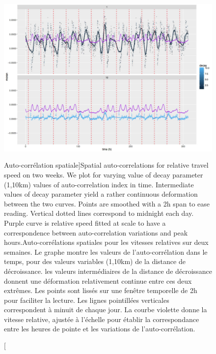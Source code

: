 \begin{figure}
\includegraphics[width=\linewidth]{Figures/Final/8-1-2-fig-transportationequilibrium-fig-5.jpg}
\caption[Spatial auto-correlations for relative travel speed][Auto-corrélation spatiale]{Spatial auto-correlations for relative travel speed on two weeks. We plot for varying value of decay parameter (1,10km) values of auto-correlation index in time. Intermediate values of decay parameter yield a rather continuous deformation between the two curves. Points are smoothed with a 2h span to ease reading. Vertical dotted lines correspond to midnight each day. Purple curve is relative speed fitted at scale to have a correspondence between auto-correlation variations and peak hours.\label{fig:transportationequilibrium:fig-5}}{Auto-corrélations spatiales pour les vitesses relatives sur deux semaines. Le graphe montre les valeurs de l'auto-corrélation dans le temps, pour des valeurs variables (1,10km) de la distance de décroissance. les valeurs intermédiaires de la distance de décroissance donnent une déformation relativement continue entre ces deux extrêmes. Les points sont lissés sur une fenêtre temporelle de 2h pour faciliter la lecture. Les lignes pointillées verticales correspondent à minuit de chaque jour. La courbe violette donne la vitesse relative, ajustée à l'échelle pour établir la correspondance entre les heures de pointe et les variations de l'auto-corrélation.\label{fig:transportationequilibrium:fig-5}}
\end{figure}





